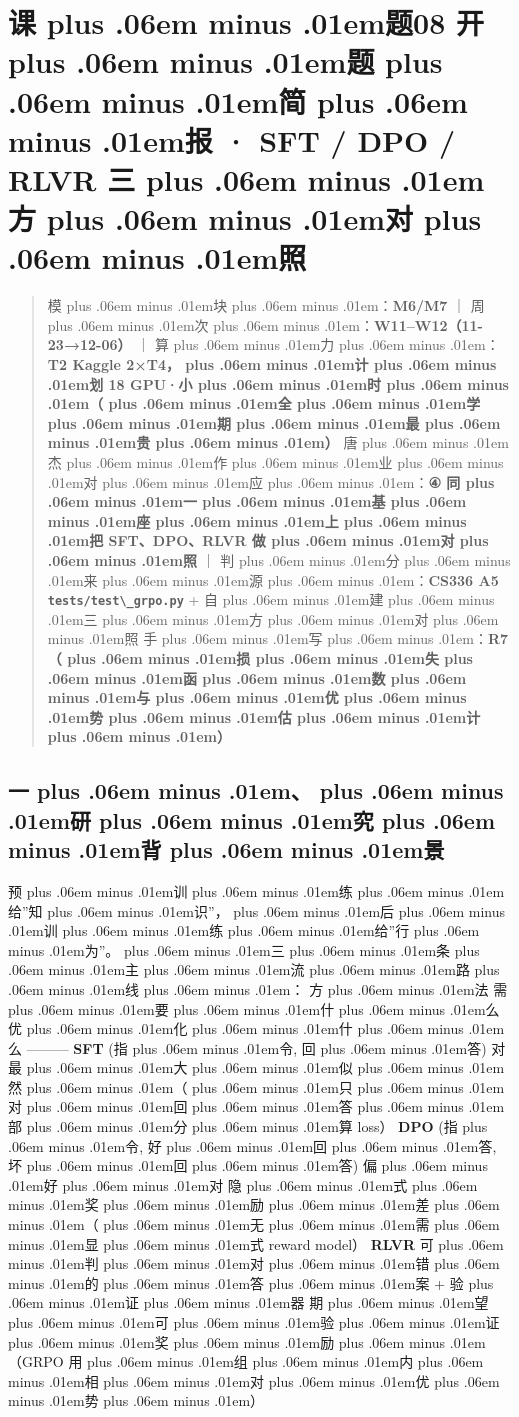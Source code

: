 \documentclass[
]{article}
\newcommand{\passthrough}[1]{#1}
\def\zh#1{{\zhfont #1}}
\def\sym#1{{\symfont #1}}
\def\zhglue{\hskip0pt plus .06em minus .01em}
\begin{document}
\newpage

\section{\zh{课\zhglue 题}08 \zh{开\zhglue 题\zhglue 简\zhglue 报} \sym{·} SFT / DPO / RLVR \zh{三\zhglue 方\zhglue 对\zhglue 照}}\label{ux8bfeux989808-ux5f00ux9898ux7b80ux62a5-sft-dpo-rlvr-ux4e09ux65b9ux5bf9ux7167}

\begin{quote}
\zh{模\zhglue 块\zhglue ：}\textbf{M6/M7} \zh{｜} \zh{周\zhglue 次\zhglue ：}\textbf{W11--W12\zh{（}11-23\sym{→}12-06\zh{）}} \zh{｜} \zh{算\zhglue 力\zhglue ：}\textbf{T2 Kaggle 2\sym{×}T4\zh{，\zhglue 计\zhglue 划} 18 GPU\sym{·}\zh{小\zhglue 时\zhglue （\zhglue 全\zhglue 学\zhglue 期\zhglue 最\zhglue 贵\zhglue ）}} \zh{唐\zhglue 杰\zhglue 作\zhglue 业\zhglue 对\zhglue 应\zhglue ：}\textbf{\sym{④} \zh{同\zhglue 一\zhglue 基\zhglue 座\zhglue 上\zhglue 把} SFT\zh{、}DPO\zh{、}RLVR \zh{做\zhglue 对\zhglue 照}} \zh{｜} \zh{判\zhglue 分\zhglue 来\zhglue 源\zhglue ：}\textbf{CS336 A5 \passthrough{\lstinline!tests/test\_grpo.py!}} + \zh{自\zhglue 建\zhglue 三\zhglue 方\zhglue 对\zhglue 照} \zh{手\zhglue 写\zhglue ：}\textbf{R7\zh{（\zhglue 损\zhglue 失\zhglue 函\zhglue 数\zhglue 与\zhglue 优\zhglue 势\zhglue 估\zhglue 计\zhglue ）}}
\end{quote}

\subsection{\zh{一\zhglue 、\zhglue 研\zhglue 究\zhglue 背\zhglue 景}}\label{ux4e00ux7814ux7a76ux80ccux666f-6}

\zh{预\zhglue 训\zhglue 练\zhglue 给}''\zh{知\zhglue 识}''\zh{，\zhglue 后\zhglue 训\zhglue 练\zhglue 给}''\zh{行\zhglue 为}''\zh{。\zhglue 三\zhglue 条\zhglue 主\zhglue 流\zhglue 路\zhglue 线\zhglue ：} \textbar{} \zh{方\zhglue 法} \textbar{} \zh{需\zhglue 要\zhglue 什\zhglue 么} \textbar{} \zh{优\zhglue 化\zhglue 什\zhglue 么} \textbar{} \textbar---\textbar---\textbar---\textbar{} \textbar{} \textbf{SFT} \textbar{} (\zh{指\zhglue 令}, \zh{回\zhglue 答}) \zh{对} \textbar{} \zh{最\zhglue 大\zhglue 似\zhglue 然\zhglue （\zhglue 只\zhglue 对\zhglue 回\zhglue 答\zhglue 部\zhglue 分\zhglue 算} loss\zh{）} \textbar{} \textbar{} \textbf{DPO} \textbar{} (\zh{指\zhglue 令}, \zh{好\zhglue 回\zhglue 答}, \zh{坏\zhglue 回\zhglue 答}) \zh{偏\zhglue 好\zhglue 对} \textbar{} \zh{隐\zhglue 式\zhglue 奖\zhglue 励\zhglue 差\zhglue （\zhglue 无\zhglue 需\zhglue 显\zhglue 式} reward model\zh{）} \textbar{} \textbar{} \textbf{RLVR} \textbar{} \zh{可\zhglue 判\zhglue 对\zhglue 错\zhglue 的\zhglue 答\zhglue 案} + \zh{验\zhglue 证\zhglue 器} \textbar{} \zh{期\zhglue 望\zhglue 可\zhglue 验\zhglue 证\zhglue 奖\zhglue 励\zhglue （}GRPO \zh{用\zhglue 组\zhglue 内\zhglue 相\zhglue 对\zhglue 优\zhglue 势\zhglue ）} \textbar{}
\end{document}
